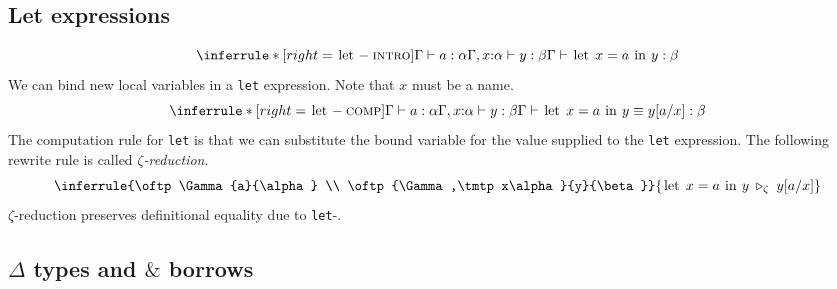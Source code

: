 \subsection{Let expressions}
\[ \inferrule*[right=\lstinline{let}-\rintro]
	{\oftp\Gamma{a}{\alpha} \\ \oftp{\Gamma,\tmtp x\alpha}{y}{\beta}}
	{\oftp\Gamma{\text{\lstinline{let}}\ x = a\ \text{\lstinline{in}}\ y}{\beta}} \]
We can bind new local variables in a \lstinline{let} expression.
Note that \( x \) must be a name.
\[ \inferrule*[right=\lstinline{let}-\rcomp]
	{\oftp\Gamma{a}{\alpha} \\ \oftp{\Gamma,\tmtp x\alpha}{y}{\beta}}
	{\jdeqtp\Gamma{\text{\lstinline{let}}\ x = a\ \text{\lstinline{in}}\ y}{y[a/x]}{\beta}} \]
The computation rule for \lstinline{let} is that we can substitute the bound variable for the value supplied to the \lstinline{let} expression.
The following rewrite rule is called \textit{\( \zeta \)-reduction}.
\[ \inferrule
	{\oftp\Gamma{a}{\alpha} \\ \oftp{\Gamma,\tmtp x\alpha}{y}{\beta}}
	{\text{\lstinline{let}}\ x = a\ \text{\lstinline{in}}\ y \;\triangleright_\zeta\; y[a/x]} \]
\( \zeta \)-reduction preserves definitional equality due to \lstinline{let}-\rcomp.

\subsection{\texorpdfstring{\( \Delta \)}{Δ} types and \texorpdfstring{\( \& \)}{\&} borrows}
